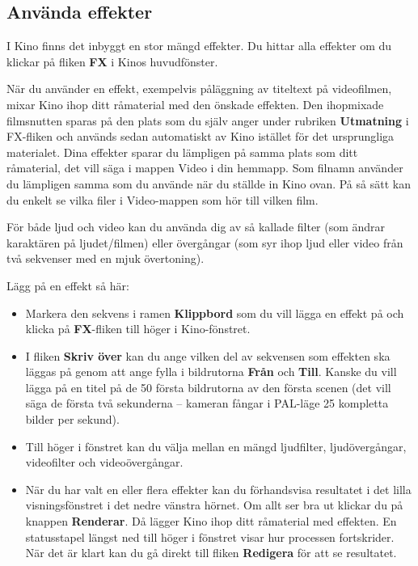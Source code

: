 \documentclass[a4paper,final]{memoir} %
\begin{document}
\subsection{Använda effekter}


I Kino finns det inbyggt en stor mängd effekter. Du hittar alla effekter om du klickar på fliken \textbf{FX} i Kinos huvudfönster.

När du använder en effekt, exempelvis påläggning av titeltext på videofilmen, mixar Kino ihop ditt råmaterial med den önskade effekten. Den ihopmixade filmsnutten sparas på den plats som du själv anger under rubriken \textbf{Utmatning} i FX-fliken och används sedan automatiskt av Kino istället för det ursprungliga materialet. Dina effekter sparar du lämpligen på samma plats som ditt råmaterial, det vill säga i mappen Video i din hemmapp. Som filnamn använder du lämpligen samma som du använde när du ställde in Kino ovan. På så sätt kan du enkelt se vilka filer i Video-mappen som hör till vilken film.

För både ljud och video kan du använda dig av så kallade filter (som ändrar karaktären på ljudet/filmen) eller övergångar (som syr ihop ljud eller video från två sekvenser med en mjuk övertoning).

Lägg på en effekt så här:

\begin{itemize}

\item Markera den sekvens i ramen \textbf{Klippbord} som du vill lägga en effekt på och klicka på \textbf{FX}-fliken till höger i Kino-fönstret.

\item I fliken \textbf{Skriv över} kan du ange vilken del av sekvensen som effekten ska läggas på genom att ange fylla i bildrutorna \textbf{Från} och \textbf{Till}. Kanske du vill lägga på en titel på de 50 första bildrutorna av den första scenen (det vill säga de första två sekunderna -- kameran fångar i PAL-läge 25 kompletta bilder per sekund).

\item Till höger i fönstret kan du välja mellan en mängd ljudfilter, ljudövergångar, videofilter och videoövergångar.

\item När du har valt en eller flera effekter kan du förhandsvisa resultatet i det lilla visningsfönstret i det nedre vänstra hörnet. Om allt ser bra ut klickar du på knappen \textbf{Renderar}. Då lägger Kino ihop ditt råmaterial med effekten. En statusstapel längst ned till höger i fönstret visar hur processen fortskrider. När det är klart kan du gå direkt till fliken \textbf{Redigera} för att se resultatet.

\end{itemize}
\end{document}
